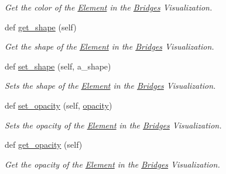 \begin{DoxyCompactItemize}
\begin{DoxyCompactList}\small\item\em Get the color of the \mbox{\hyperlink{namespace_bridges_1_1_element}{Element}} in the \mbox{\hyperlink{namespace_bridges_1_1_bridges}{Bridges}} Visualization. \end{DoxyCompactList}\item 
def \mbox{\hyperlink{class_bridges_1_1_element_visualizer_1_1_element_visualizer_aa1fe7978af156f5a2a2cad15eda02287}{get\+\_\+shape}} (self)
\begin{DoxyCompactList}\small\item\em Get the shape of the \mbox{\hyperlink{namespace_bridges_1_1_element}{Element}} in the \mbox{\hyperlink{namespace_bridges_1_1_bridges}{Bridges}} Visualization. \end{DoxyCompactList}\item 
def \mbox{\hyperlink{class_bridges_1_1_element_visualizer_1_1_element_visualizer_a82348f58c951b0608ec4fb04eaa3e097}{set\+\_\+shape}} (self, a\+\_\+shape)
\begin{DoxyCompactList}\small\item\em Sets the shape of the \mbox{\hyperlink{namespace_bridges_1_1_element}{Element}} in the \mbox{\hyperlink{namespace_bridges_1_1_bridges}{Bridges}} Visualization. \end{DoxyCompactList}\item 
def \mbox{\hyperlink{class_bridges_1_1_element_visualizer_1_1_element_visualizer_a35f9781eaadd9ce1149cfbc8475a3c51}{set\+\_\+opacity}} (self, \mbox{\hyperlink{class_bridges_1_1_element_visualizer_1_1_element_visualizer_ab26841a89ad63bac0828c15b01ec92b2}{opacity}})
\begin{DoxyCompactList}\small\item\em Sets the opacity of the \mbox{\hyperlink{namespace_bridges_1_1_element}{Element}} in the \mbox{\hyperlink{namespace_bridges_1_1_bridges}{Bridges}} Visualization. \end{DoxyCompactList}\item 
def \mbox{\hyperlink{class_bridges_1_1_element_visualizer_1_1_element_visualizer_a54a58179a82e3d571069f2918114ce9e}{get\+\_\+opacity}} (self)
\begin{DoxyCompactList}\small\item\em Get the opacity of the \mbox{\hyperlink{namespace_bridges_1_1_element}{Element}} in the \mbox{\hyperlink{namespace_bridges_1_1_bridges}{Bridges}} Visualization. \end{DoxyCompactList}\end{DoxyCompactItemize}
